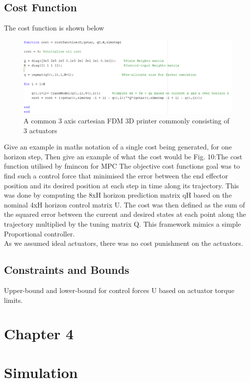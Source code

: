 \documentclass{UoNMCHA}
\numberwithin{equation}{section}
\begin{document}
	\subsection*{Cost Function}
	The cost function is shown below
	
	\begin{figure}[H]
		\begin{center}
			\includegraphics[width=.8\linewidth]{figs/Picture12}
			\caption{A  common 3 axis cartesian FDM 3D printer commonly consisting of 3 actuators}
			\label{figs/Picture12}
		\end{center}
	\end{figure}
	
	
	Give an example in maths notation of a single cost being generated, for one horizon step,
	Then give an example of what the cost would be 
	Fig. 10:The cost function utilised by fmincon for MPC
	The objective cost functions goal was to find such a control force that minimised the error between the end effector position and its desired position at each step in time along its trajectory. This was done by computing the 8xH horizon prediction matrix qH based on the nominal 4xH horizon control matrix U. The cost was then defined as the sum of the squared error between the current and desired states at each point along the trajectory multiplied by the tuning matrix Q. This framework mimics a simple Proportional controller. \\
	As we assumed ideal actuators, there was no cost punishment on the actuators.
	\subsection*{Constraints and Bounds}
	Upper-bound and lower-bound for control forces U based on actuator torque limits.
	
	
	\newpage
	\section*{Chapter 4}
	\section{Simulation}
	
\end{document}
